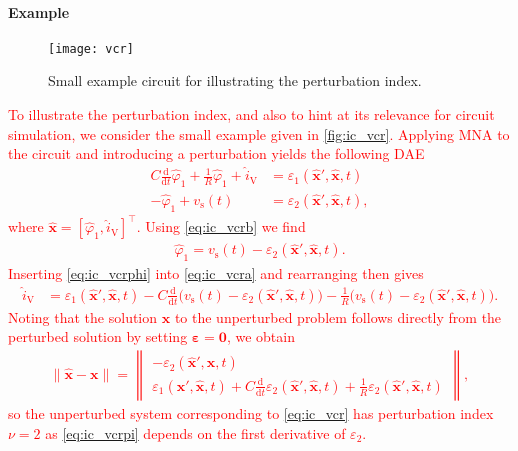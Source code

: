 \documentclass[AMA,STIX1COL]{WileyNJD-v2}
\newcommand{\mb}[1]{\mathbf{#1}}
\newcommand{\mbh}[1]{\hat{\mathbf{#1}}}
\newcommand{\mr}[1]{\mathrm{#1}}
\newcommand{\T}{{\!\top}}
\newcommand{\ddt}{\frac{\mathrm{d}}{\mathrm{d}t}}
\begin{document}
\paragraph{Example}
\begin{figure}[b]
    \begin{center}
        \texttt{[image: vcr]}
    \end{center}
    \caption{Small example circuit for illustrating the perturbation index.}
    \label{fig:ic_vcr}
\end{figure}
\textcolor{red}{To illustrate the perturbation index, and also to hint at its relevance for circuit simulation, we consider the small example given in \autoref{fig:ic_vcr}. Applying MNA to the circuit and introducing a perturbation yields the following DAE
\begin{subequations}
    \label{eq:ic_vcr}
    \begin{align}
        C \ddt \hat{\varphi}_1 + \frac{1}{R} \hat{\varphi}_1 + \hat{i}_\mr{V} &= \varepsilon_1(\mbh{x}', \mbh{x}, t) \label{eq:ic_vcra}\\
        -\hat{\varphi}_1 + v_\mr{s}(t) &= \varepsilon_2(\mbh{x}', \mbh{x}, t), \label{eq:ic_vcrb}
    \end{align}
\end{subequations}
where $\mbh{x} = [\hat{\varphi}_1, \hat{i}_\mr{V}]^\T$. Using \eqref{eq:ic_vcrb} we find
\begin{align}
    \hat{\varphi}_1 = v_\mr{s}(t) - \varepsilon_2(\mbh{x}', \mbh{x}, t). \label{eq:ic_vcrphi}
\end{align}
Inserting \eqref{eq:ic_vcrphi} into \eqref{eq:ic_vcra} and rearranging then gives
\begin{align*}
    \hat{i}_\mr{V} &= \varepsilon_1(\mbh{x}', \mbh{x}, t) - C \ddt \big( v_\mr{s}(t) - \varepsilon_2(\mbh{x}', \mbh{x}, t) \big) - \frac{1}{R} \big( v_\mr{s}(t) - \varepsilon_2(\mbh{x}', \mbh{x}, t) \big).
\end{align*}
Noting that the solution $\mb{x}$ to the unperturbed problem follows directly from the perturbed solution by setting $\boldsymbol{\varepsilon} = \mb{0}$, we obtain
\begin{align}
    \| \mbh{x} - \mb{x} \| = \begin{Vmatrix}
        -\varepsilon_2(\mbh{x}', \mbh{x}, t)\\
        \varepsilon_1(\mbh{x}', \mbh{x}, t) + C \ddt \varepsilon_2(\mbh{x}', \mbh{x}, t) + \frac{1}{R} \varepsilon_2(\mbh{x}', \mbh{x}, t)
    \end{Vmatrix}, \label{eq:ic_vcrpi}
\end{align}
so the unperturbed system corresponding to \eqref{eq:ic_vcr} has perturbation index $\nu = 2$ as \eqref{eq:ic_vcrpi} depends on the first derivative of $\varepsilon_2$.}
\end{document}

